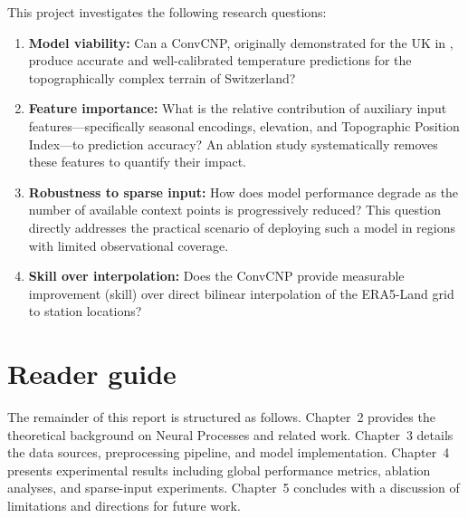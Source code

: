 This project investigates the following research questions:

\begin{enumerate}
    \item \textbf{Model viability:} Can a ConvCNP, originally demonstrated for the UK in \citet{vaughan2022}, produce accurate and well-calibrated temperature predictions for the topographically complex terrain of Switzerland?
    \item \textbf{Feature importance:} What is the relative contribution of auxiliary input features---specifically seasonal encodings, elevation, and Topographic Position Index---to prediction accuracy? An ablation study systematically removes these features to quantify their impact.
    \item \textbf{Robustness to sparse input:} How does model performance degrade as the number of available context points is progressively reduced? This question directly addresses the practical scenario of deploying such a model in regions with limited observational coverage.
    \item \textbf{Skill over interpolation:} Does the ConvCNP provide measurable improvement (skill) over direct bilinear interpolation of the ERA5-Land grid to station locations?
\end{enumerate}

\section{Reader guide}

The remainder of this report is structured as follows. Chapter~2 provides the theoretical background on Neural Processes and related work. Chapter~3 details the data sources, preprocessing pipeline, and model implementation. Chapter~4 presents experimental results including global performance metrics, ablation analyses, and sparse-input experiments. Chapter~5 concludes with a discussion of limitations and directions for future work.


